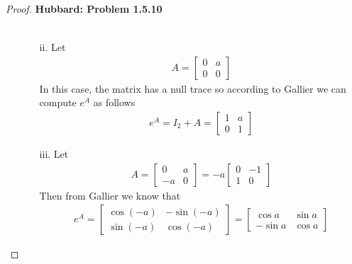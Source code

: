 \documentclass[11pt]{article}
\theoremstyle{definition}
\begin{document}
\begin{proof}{\textbf{Hubbard: Problem 1.5.10}}
\begin{itemize}
\begin{itemize}
\begin{align*}
        \end{align*}
        \item [ii.] Let
        \begin{align*}
            A = \begin{bmatrix} 0 & a \\ 0 & 0 \end{bmatrix}
        \end{align*}
        In this case, the matrix has a null trace so according to
        Gallier we can compute $e^A$ as follows
        \begin{align*}
            e^A = I_2 + A = \begin{bmatrix} 1 & a \\ 0 & 1 \end{bmatrix}
        \end{align*}
        \item [iii.] Let 
        \begin{align*}
            A = \begin{bmatrix} 0 & a \\ -a & 0 \end{bmatrix}
            = -a\begin{bmatrix} 0 & -1 \\ 1 & 0 \end{bmatrix}
        \end{align*}
        Then from Gallier we know that
        \begin{align*}
            e^A = \begin{bmatrix} \cos(-a) & -\sin(-a) \\
            \sin(-a) & \cos(-a) \end{bmatrix}
            = \begin{bmatrix} \cos a & \sin a \\
            -\sin a & \cos a \end{bmatrix}
        \end{align*}
    \end{itemize}


\end{itemize}
\end{proof}
\end{document}
